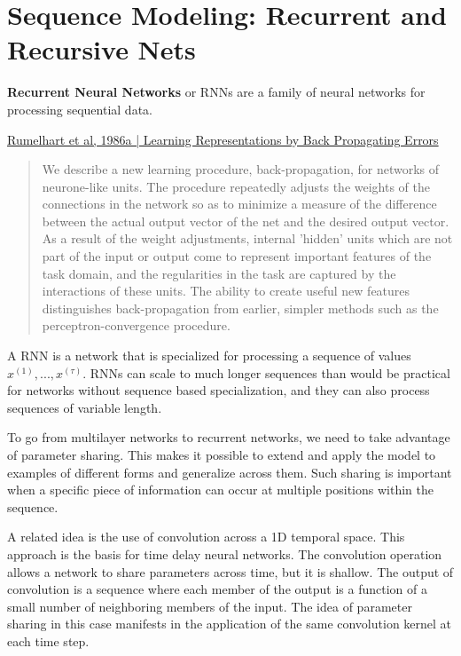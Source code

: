 \documentclass[onecolumn, letterpaper, 12pt]{report}
\begin{document}

\chapter{Sequence Modeling: Recurrent and Recursive Nets}

\textbf{Recurrent Neural Networks} or RNNs are a family of neural networks for processing sequential data. 

\href{https://www.iro.umontreal.ca/~vincentp/ift3395/lectures/backprop_old.pdf}{Rumelhart et al, 1986a | Learning Representations by Back Propagating Errors}

\begin{quote}
  We describe a new learning procedure, back-propagation, for networks
  of neurone-like units. The procedure repeatedly adjusts the weights
  of the connections in the network so as to minimize a measure of the
  difference between the actual output vector of the net and the
  desired output vector. As a result of the weight adjustments,
  internal 'hidden' units which are not part of the input or output
  come to represent important features of the task domain, and the
  regularities in the task are captured by the interactions of these
  units. The ability to create useful new features distinguishes
  back-propagation from earlier, simpler methods such as the
  perceptron-convergence procedure.
\end{quote}

A RNN is a network that is specialized for processing a sequence of values $x^{(1)}, ..., x^{(\tau)}$. RNNs can scale to much longer sequences than would be practical for networks without sequence based specialization, and they can also process sequences of variable length. 

To go from multilayer networks to recurrent networks, we need to take advantage of parameter sharing. This makes it possible to extend and apply the model to examples of different forms and generalize across them. Such sharing is important when a specific piece of information can occur at multiple positions within the sequence.

A related idea is the use of convolution across a 1D temporal space. This approach is the basis for time delay neural networks. The convolution operation allows a network to share parameters across time, but it is shallow. The output of convolution is a sequence where each member of the output is a function of a small number of neighboring members of the input. The idea of parameter sharing in this case manifests in the application of the same convolution kernel at each time step.
\end{document}
